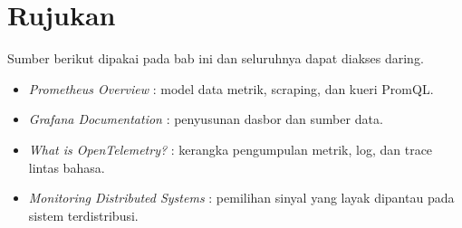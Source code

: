 \section{Rujukan}

Sumber berikut dipakai pada bab ini dan seluruhnya dapat diakses daring.

\begin{itemize}
  \item \textit{Prometheus Overview} \cite{doc-prometheus}: model data metrik, scraping, dan kueri PromQL.
  \item \textit{Grafana Documentation} \cite{doc-grafana}: penyusunan dasbor dan sumber data.
  \item \textit{What is OpenTelemetry?} \cite{doc-otel}: kerangka pengumpulan metrik, log, dan trace lintas bahasa.
  \item \textit{Monitoring Distributed Systems} \cite{sre-monitoring}: pemilihan sinyal yang layak dipantau pada sistem terdistribusi.
\end{itemize}
